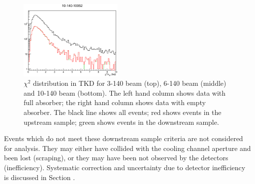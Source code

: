 \begin{figure}[!tbh]
    \includegraphics*[width=0.45\textwidth]{analysis_plots/plots_10-140-empty/chi2_tkd.eps}
    \caption{$\chi^2$ distribution in TKD for 3-140 beam (top), 6-140 beam (middle) and 10-140 beam (bottom).
    The left hand column shows data with full absorber; the right hand column shows data with empty absorber.
    The black line shows all events; red shows events in the upstream sample; green shows events in the downstream sample.
\label{fig:tkd_chi2}}
\end{figure}

Events which do not meet these downstream sample criteria are not considered
for analysis. They may either have collided with the cooling channel aperture 
and been lost (scraping), or 
they may have been not observed by the detectors (inefficiency). Systematic 
correction and uncertainty due to detector inefficiency is discussed in Section 
\cite{sec:inefficiency}.

